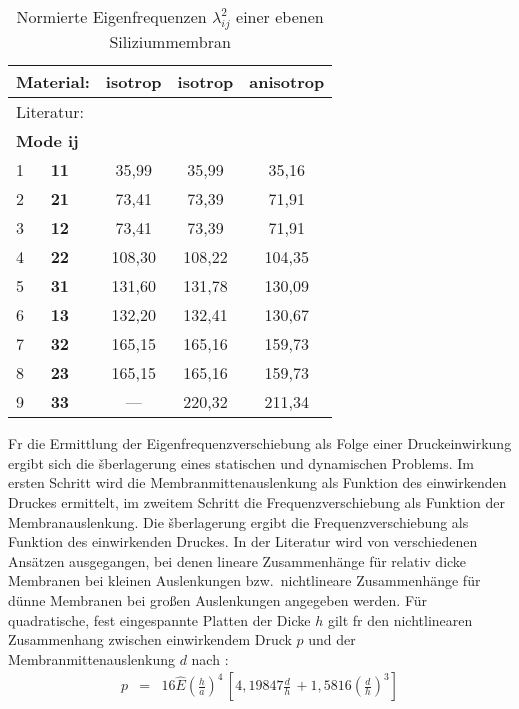 \begin{table}[htb]
\caption{\label{tabcij}
 Normierte Eigenfrequenzen $\lambda_{ij}^{2}$ einer ebenen Siliziummembran}
\begin{center}
\begin{tabular}{|l||c|c|c|} \hline
 {\bf Material}: & {\bf isotrop} & {\bf isotrop} & {\bf anisotrop} \\
\hline
 Literatur:      & \cite{Ble84}  &  \cite{Pon91} & \cite{Pon91} \\ \hline
\hline
{\bf Mode ij}   &               &               & \\
 1 $ \quad $ {\bf 11} & 35,99  & 35,99 & 35,16 \\
 2 $ \quad $ {\bf 21} & 73,41  & 73,39 & 71,91 \\
 3 $ \quad $ {\bf 12} & 73,41  & 73,39 & 71,91 \\
 4 $ \quad $ {\bf 22} & 108,30  & 108,22 & 104,35 \\
 5 $ \quad $ {\bf 31} & 131,60  & 131,78 & 130,09 \\
 6 $ \quad $ {\bf 13} & 132,20  & 132,41 & 130,67 \\
 7 $ \quad $ {\bf 32} & 165,15  & 165,16 & 159,73 \\
 8 $ \quad $ {\bf 23} & 165,15  & 165,16 & 159,73 \\
 9 $ \quad $ {\bf 33} & ---     & 220,32 & 211,34 \\ \hline
\end{tabular}
\end{center}
\end{table}
Fr die Ermittlung der Eigenfrequenzverschiebung als Folge einer
Druckeinwirkung ergibt sich die šberlagerung eines statischen
und dynamischen Problems. Im
ersten Schritt wird die Membranmittenauslenkung als Funktion des
einwirkenden Druckes ermittelt, im zweitem Schritt die
Frequenzverschiebung als Funktion der Membranauslenkung.  Die
šberlagerung ergibt die Frequenzverschiebung als Funktion des
einwirkenden Druckes. In der Literatur wird von verschiedenen Ansätzen
ausgegangen, bei denen lineare Zusammenhänge für relativ dicke Membranen
bei kleinen Auslenkungen bzw.\ nichtlineare Zusammenhänge für dünne
Membranen bei großen Auslenkungen angegeben werden.  Für quadratische,
fest eingespannte Platten der Dicke $h$ gilt fr den nichtlinearen
Zusammenhang zwischen einwirkendem Druck $p$ und der
Membranmittenauslenkung $ d $ nach \cite{Cha87}:
%
\begin{eqnarray}
\label{pvond}
 p & = & 16 \hat E \left( \frac{h}{a} \right)^{4} \, \left[ 4,19847
 \frac{d}{h} \, + 1,5816 \left( \frac{d}{h} \right)^{3} \right]
\end{eqnarray}
